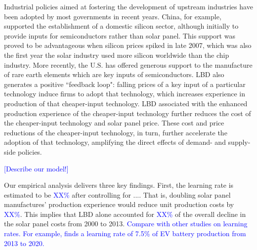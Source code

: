 \documentclass[12pt, letter]{article}
\begin{document}
Industrial policies aimed at fostering the development of upstream industries have been adopted by most governments in recent years. China, for example, supported the establishment of a domestic silicon sector, although initially to provide inputs for semiconductors rather than solar panel. This support was proved to be advantageous when silicon prices spiked in late 2007, which was also the first year the solar industry used more silicon worldwide than the chip industry. More recently, the U.S. has offered generous support to the manufacture of rare earth elements which are key inputs of semiconductors. 
LBD also generates a positive ``feedback loop": falling prices of a key input of a particular technology induce firms to adopt that technology, which increases experience in production of that cheaper-input technology. LBD associated with the enhanced production experience of the cheaper-input technology further reduces the cost of the cheaper-input technology and solar panel price. These cost and price reductions of the cheaper-input technology, in turn, further accelerate the adoption of that technology, amplifying the direct effects of demand- and supply-side policies.

\textcolor{blue}{[Describe our model!]}

Our empirical analysis delivers three key findings. First, the learning rate is estimated to be \textcolor{blue}{XX\%} after controlling for .... That is, doubling solar panel manufactures' production experience would reduce unit production costs by \textcolor{blue}{XX\%}. This implies that LBD alone accounted for \textcolor{blue}{XX\%} of the overall decline in the solar panel costs from 2000 to 2013. \textcolor{blue}{Compare with other studies on learning rates. For example, \citet{barwick2025drive} finds a learning rate of 7.5\% of EV battery production from 2013 to 2020.}
\end{document}
